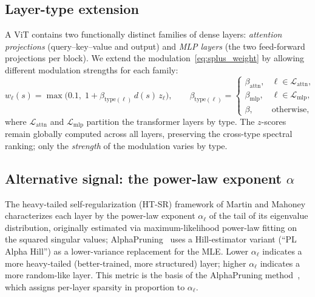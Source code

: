 \documentclass[11pt]{article}
\theoremstyle{plain}
\theoremstyle{definition}
\theoremstyle{remark}
\newcommand{\1}{\mathbf{1}}
\begin{document}
\subsection{Layer-type extension}
\label{subsec:layer_type}

A ViT contains two functionally distinct families of dense layers: \emph{attention projections} (query--key--value and output) and \emph{MLP layers} (the two feed-forward projections per block).  We extend the modulation~\eqref{eq:splus_weight} by allowing different modulation strengths for each family:
\begin{equation}
\label{eq:layertype_weight}
w_\ell(s)
= \max\!\Big(0.1,\;1 + \beta_{\mathrm{type}(\ell)}\,d(s)\,z_\ell\Big),
\qquad
\beta_{\mathrm{type}(\ell)}
=
\begin{cases}
\beta_{\mathrm{attn}}, & \ell \in \mathcal{L}_{\mathrm{attn}},\\[2pt]
\beta_{\mathrm{mlp}}, & \ell \in \mathcal{L}_{\mathrm{mlp}},\\[2pt]
\beta, & \text{otherwise},
\end{cases}
\end{equation}
where \(\mathcal{L}_{\mathrm{attn}}\) and \(\mathcal{L}_{\mathrm{mlp}}\) partition the transformer layers by type. The \(z\)-scores remain globally computed across all layers, preserving the cross-type spectral ranking; only the \emph{strength} of the modulation varies by type.

\subsection{Alternative signal: the power-law exponent \texorpdfstring{\(\alpha\)}{alpha}}
\label{subsec:alpha_signal}

The heavy-tailed self-regularization (HT-SR) framework of Martin and Mahoney~\cite{martin2021implicit,martin2020heavy} characterizes each layer by the power-law exponent \(\alpha_\ell\) of the tail of its eigenvalue distribution, originally estimated via maximum-likelihood power-law fitting on the squared singular values; AlphaPruning~\cite{lu2024alphapruning} uses a Hill-estimator variant (``PL Alpha Hill'') as a lower-variance replacement for the MLE.  Lower \(\alpha_\ell\) indicates a more heavy-tailed (better-trained, more structured) layer; higher \(\alpha_\ell\) indicates a more random-like layer.  This metric is the basis of the AlphaPruning method~\cite{lu2024alphapruning}, which assigns per-layer sparsity in proportion to \(\alpha_\ell\).
\end{document}
